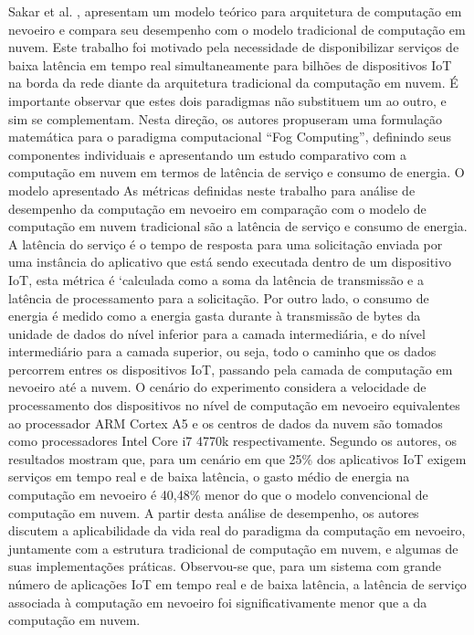  Sakar et al. \cite{sarkar2016theoretical}, apresentam um modelo teórico para arquitetura de computação em nevoeiro e compara seu desempenho com o modelo tradicional de computação em nuvem. Este trabalho foi motivado pela necessidade de disponibilizar serviços de baixa latência em tempo real simultaneamente para bilhões de dispositivos IoT na borda da rede diante da arquitetura tradicional da computação em nuvem. É importante observar que estes dois paradigmas não substituem um ao outro, e sim se complementam.
    Nesta direção, os autores propuseram uma formulação matemática para o paradigma computacional “Fog Computing”, definindo seus componentes individuais e apresentando um estudo comparativo com a computação em nuvem em termos de latência de serviço e consumo de energia. O modelo apresentado
As métricas definidas neste trabalho para análise de desempenho da computação em nevoeiro em comparação com o modelo de computação em nuvem tradicional são a latência de serviço e consumo de energia. A latência do serviço é o tempo de resposta para uma solicitação enviada por uma instância do aplicativo que está sendo executada dentro de um dispositivo IoT, esta métrica é ‘calculada como a soma da latência de transmissão e a latência de processamento para a solicitação. Por outro lado, o consumo de energia é medido como a energia gasta durante à transmissão de bytes da unidade de dados do nível inferior para a camada intermediária, e do nível intermediário para a camada superior, ou seja, todo o caminho que os dados percorrem entres os dispositivos IoT, passando pela camada de computação em nevoeiro até a nuvem.
O cenário do experimento considera a velocidade de processamento dos dispositivos no nível de computação em nevoeiro equivalentes ao processador ARM Cortex A5 e os centros de dados da nuvem são tomados como processadores Intel Core i7 4770k respectivamente.
Segundo os autores, os resultados mostram que, para um cenário em que 25\% dos aplicativos IoT exigem serviços em tempo real e de baixa latência, o gasto médio de energia na computação em nevoeiro é 40,48\% menor do que o modelo convencional de computação em nuvem. A partir desta análise de desempenho, os autores discutem a aplicabilidade da vida real do paradigma da computação em nevoeiro, juntamente com a estrutura tradicional de computação em nuvem, e algumas de suas implementações práticas. Observou-se que, para um sistema com grande número de aplicações IoT em tempo real e de baixa latência, a latência de serviço associada à computação em nevoeiro foi significativamente menor que a da computação em nuvem.




